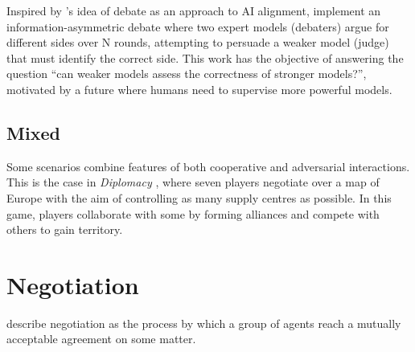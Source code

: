 Inspired by \textcite{irving2018aisafetydebate}'s idea of debate as an approach to \ac{AI} alignment, \textcite{khan_debating_2024} implement an information-asymmetric debate where two expert models (debaters) argue for different sides over N rounds, attempting to persuade a weaker model (judge) that must identify the correct side. This work has the objective of answering the question ``can weaker models assess the correctness of stronger models?'', motivated by a future where humans need to supervise more powerful models.


\subsection{Mixed}

Some scenarios combine features of both cooperative and adversarial interactions. This is the case in \textit{Diplomacy} \parencite{doi:10.1126/science.ade9097}, where seven players negotiate over a map of Europe with the aim of controlling as many supply centres as possible. In this game, players collaborate with some by forming alliances and compete with others to gain territory.

\section{Negotiation} \label{sec:negotiation}


\textcite{Jennings2001AutomatedNegotiation} describe negotiation as the process by which a group of agents reach a mutually acceptable agreement on some matter.

